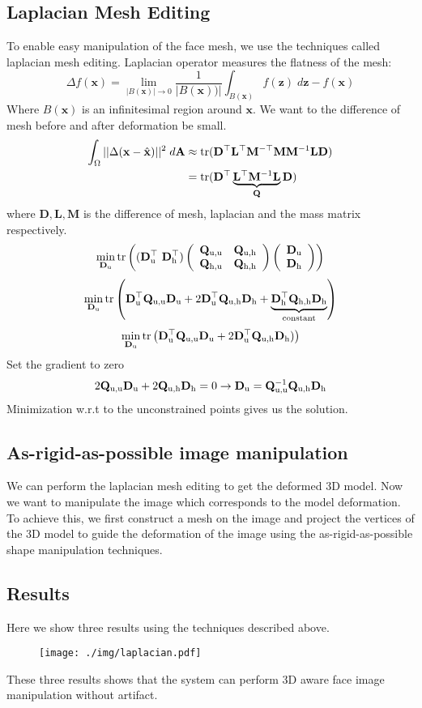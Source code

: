 \subsection{Laplacian Mesh Editing}
To enable easy manipulation of the face mesh, we use the techniques called laplacian mesh editing.
Laplacian operator measures the flatness of the mesh:
$$\Delta f(\mathbf{x}) = \lim_{|B(\mathbf{x})| \rightarrow 0} \frac{1}{|B(\mathbf{x}))|} \int_{B(\mathbf{x})} f(\mathbf{z}) \;d\mathbf{z} - f(\mathbf{x})$$
Where $B(\mathbf{x})$ is an infinitesimal region around $\mathbf{x}$.
We want to the difference of mesh before and after deformation be small.  
\begin{align*}
\int_\Omega ||\Delta(\mathbf{x} - \hat{\mathbf{x}})||^2 \; d\mathbf{A} & \approx \text{tr}( \mathbf{D}^\top \mathbf{L}^\top \mathbf{M}^{-\top} \mathbf{M} \mathbf{M}^{-1} \mathbf{L}\mathbf{D})\\
&= \text{tr}(  \mathbf{D}^\top \underbrace{\mathbf{L}^\top \mathbf{M}^{-1} \mathbf{L}}_{\mathbf{Q}} \mathbf{D})
\end{align*}
where $\mathbf{D}, \mathbf{L}, \mathbf{M}$ is the difference of mesh, laplacian and the mass matrix respectively. 
$$
\min_{\mathbf{D}_\text{u}}
\operatorname{tr} \left((\mathbf{D}_\text{u}^\top \ \mathbf{D}_\text{h}^\top)
\left(\begin{array}{cc}
\mathbf{Q}_\text{u,u} & \mathbf{Q}_\text{u,h} \\
\mathbf{Q}_\text{h,u} & \mathbf{Q}_\text{h,h} 
\end{array}\right)
\left(\begin{array}{c}
  \mathbf{D}_\text{u} \\
  \mathbf{D}_\text{h}
\end{array}
\right)\right)
$$
$$
\min_{\mathbf{D}_\text{u}}
\operatorname{tr}\left(\mathbf{D}_\text{u}^\top \mathbf{Q}_\text{u,u} \mathbf{D}_\text{u} +
2 \mathbf{D}_\text{u}^\top \mathbf{Q}_\text{u,h} \mathbf{D}_\text{h} + 
\underbrace{\mathbf{D}_\text{h}^\top \mathbf{Q}_\text{h,h}
\mathbf{D}_\text{h}}_\text{constant}\right)
$$
$$
\min_{\mathbf{D}_\text{u}} 
\operatorname{tr}\left(
\mathbf{D}_\text{u}^\top \mathbf{Q}_\text{u,u} \mathbf{D}_\text{u} +
2 \mathbf{D}_\text{u}^\top \mathbf{Q}_\text{u,h} \mathbf{D}_\text{h})
\right)
$$
Set the gradient to zero
$$2 \mathbf{Q}_\text{u,u} \mathbf{D}_\text{u} + 2 \mathbf{Q}_\text{u,h} \mathbf{D}_\text{h} = 0 \rightarrow \mathbf{D}_\text{u} = \mathbf{Q}_\text{u,u}^{-1} \mathbf{Q}_\text{u,h} \mathbf{D}_\text{h}$$
Minimization w.r.t to the unconstrained points gives us the solution.

\subsection{As-rigid-as-possible image manipulation}
We can perform the laplacian mesh editing to get the deformed 3D model. Now we want to manipulate the image which corresponds to the model deformation. To achieve this, we first construct a mesh on the image and project the vertices of the 3D model to guide the deformation of the image using the as-rigid-as-possible shape manipulation techniques\cite{igarashi2005rigid}.

\subsection{Results}
Here we show three results using the techniques described above.
\begin{figure}[H]
  \texttt{[image: ./img/laplacian.pdf]}
\end{figure}
These three results shows that the system can perform 3D aware face image manipulation without artifact.
